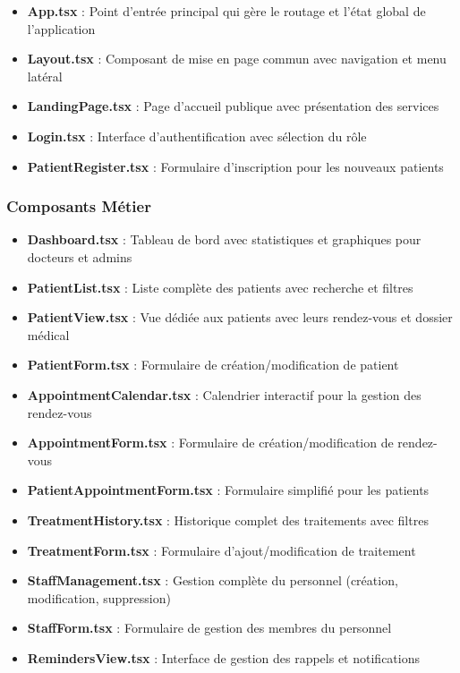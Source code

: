 \documentclass[12pt,a4paper]{report}
\begin{document}
\begin{itemize}
    \item \textbf{App.tsx} : Point d'entrée principal qui gère le routage et l'état global de l'application
    \item \textbf{Layout.tsx} : Composant de mise en page commun avec navigation et menu latéral
    \item \textbf{LandingPage.tsx} : Page d'accueil publique avec présentation des services
    \item \textbf{Login.tsx} : Interface d'authentification avec sélection du rôle
    \item \textbf{PatientRegister.tsx} : Formulaire d'inscription pour les nouveaux patients
\end{itemize}

\subsubsection{Composants Métier}

\begin{itemize}
    \item \textbf{Dashboard.tsx} : Tableau de bord avec statistiques et graphiques pour docteurs et admins
    \item \textbf{PatientList.tsx} : Liste complète des patients avec recherche et filtres
    \item \textbf{PatientView.tsx} : Vue dédiée aux patients avec leurs rendez-vous et dossier médical
    \item \textbf{PatientForm.tsx} : Formulaire de création/modification de patient
    \item \textbf{AppointmentCalendar.tsx} : Calendrier interactif pour la gestion des rendez-vous
    \item \textbf{AppointmentForm.tsx} : Formulaire de création/modification de rendez-vous
    \item \textbf{PatientAppointmentForm.tsx} : Formulaire simplifié pour les patients
    \item \textbf{TreatmentHistory.tsx} : Historique complet des traitements avec filtres
    \item \textbf{TreatmentForm.tsx} : Formulaire d'ajout/modification de traitement
    \item \textbf{StaffManagement.tsx} : Gestion complète du personnel (création, modification, suppression)
    \item \textbf{StaffForm.tsx} : Formulaire de gestion des membres du personnel
    \item \textbf{RemindersView.tsx} : Interface de gestion des rappels et notifications
\end{itemize}
\end{document}
